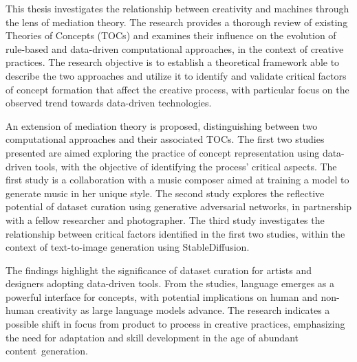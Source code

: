 This thesis investigates the relationship between creativity and machines through the lens of mediation theory. The research provides a thorough review of existing Theories of Concepts (TOCs) and examines their influence on the evolution of rule-based and data-driven computational approaches, in the context of creative practices. The research objective is to establish a theoretical framework able to describe the two approaches and utilize it to identify and validate critical factors of concept formation that affect the creative process, with particular focus on the observed trend towards data-driven technologies.

An extension of mediation theory is proposed, distinguishing between two computational approaches and their associated TOCs. The first two studies presented are aimed exploring the practice of concept representation using data-driven tools, with the objective of identifying the process' critical aspects. The first study is a collaboration with a music composer aimed at training a model to generate music in her unique style. The second study explores the reflective potential of dataset curation using generative adversarial networks, in partnership with a fellow researcher and photographer. The third study investigates the relationship between critical factors identified in the first two studies, within the context of text-to-image generation using StableDiffusion.

The findings highlight the significance of dataset curation for artists and designers adopting data-driven tools. From the studies, language emerges as a powerful interface for concepts, with potential implications on human and non-human creativity as large language models advance. The research indicates a possible shift in focus from product to process in creative practices, emphasizing the need for adaptation and skill development in the age of abundant content generation.